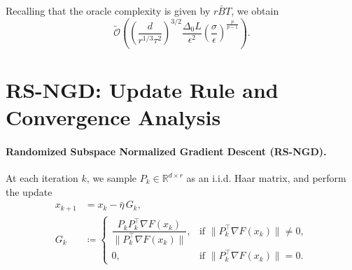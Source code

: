 \documentclass[10pt]{article}
\begin{document}
Recalling that the oracle complexity is given by $r\bar{B}T$,
we obtain
\[
\tilde{\mathcal{O}}\!\left(
  \left(\frac{d}{r^{1/3}\tau^2}\right)^{3/2}
  \frac{\Delta_0 L}{\epsilon^2}
  \left(\frac{\sigma}{\epsilon}\right)^{\frac{p}{p-1}}
\right).
\]





























































\section{RS-NGD: Update Rule and Convergence Analysis}
\label{app:rngd}
\paragraph{Randomized Subspace Normalized Gradient Descent (RS-NGD).}
At each iteration $k$, we sample $P_k \in \mathbb{R}^{d\times r}$ as an i.i.d. Haar matrix,
and perform the update
\begin{align*}
x_{k+1} &= x_k - \bar{\eta}\, G_k,\\
G_k &\coloneqq
\begin{cases}
\dfrac{P_kP_k^\top \nabla F(x_k)}{\|P_k^\top \nabla F(x_k)\|},
& \text{if } \|P_k^\top \nabla F(x_k)\|\neq 0,\\[2mm]
0,
& \text{if } \|P_k^\top \nabla F(x_k)\|=0.
\end{cases}
\end{align*}
\end{document}
